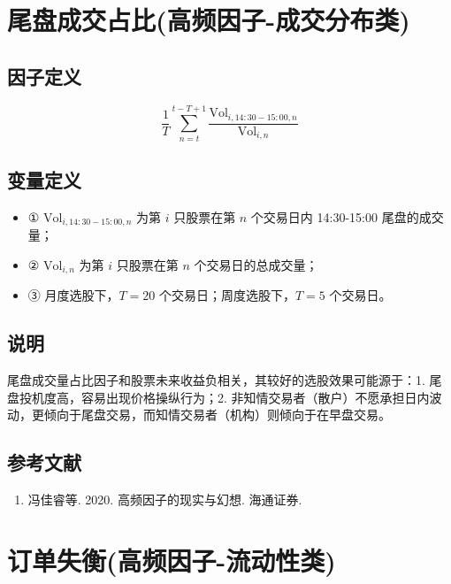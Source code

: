 \documentclass{article}
\begin{document}
\section{尾盘成交占比(高频因子-成交分布类)}

\subsection{因子定义}
\begin{equation}
    \frac{1}{T} \sum_{n=t}^{t-T+1} \frac{\mathrm{Vol}_{i,14:30-15:00,n}}{\mathrm{Vol}_{i,n}}
\end{equation}

\subsection{变量定义}
\begin{itemize}
    \item ① \( \mathrm{Vol}_{i,14:30-15:00,n} \) 为第 \( i \) 只股票在第 \( n \) 个交易日内 14:30-15:00 尾盘的成交量；
    \item ② \( \mathrm{Vol}_{i,n} \) 为第 \( i \) 只股票在第 \( n \) 个交易日的总成交量；
    \item ③ 月度选股下，\( T=20 \) 个交易日；周度选股下，\( T=5 \) 个交易日。
\end{itemize}

\subsection{说明}
尾盘成交量占比因子和股票未来收益负相关，其较好的选股效果可能源于：1. 尾盘投机度高，容易出现价格操纵行为；2. 非知情交易者（散户）不愿承担日内波动，更倾向于尾盘交易，而知情交易者（机构）则倾向于在早盘交易。

\subsection{参考文献}
\begin{enumerate}
    \item 冯佳睿等. 2020. 高频因子的现实与幻想. 海通证券.
\end{enumerate}

\section{订单失衡(高频因子-流动性类)}
\end{document}
